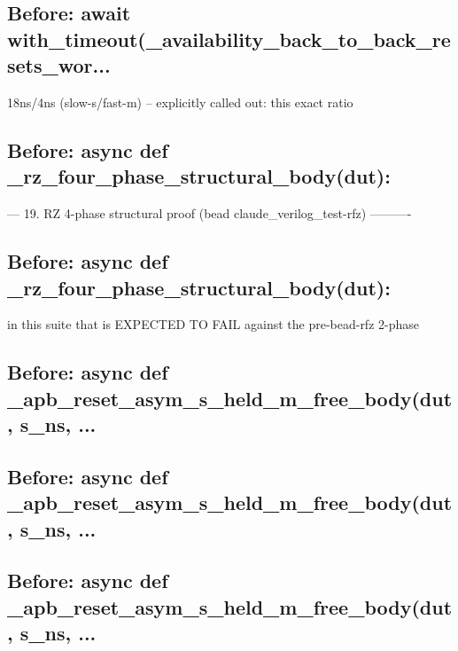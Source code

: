 \begin{record}
\subsection*{Before: await with\_timeout(\_availability\_back\_to\_back\_resets\_wor...}

\begin{textblock}
18ns/4ns (slow-s/fast-m) -- explicitly called out: this exact ratio
\end{textblock}

\subsection*{Before: async def \_rz\_four\_phase\_structural\_body(dut):}

\begin{textblock}
--- 19. RZ 4-phase structural proof (bead claude_verilog_test-rfz) ----------
\end{textblock}

\subsection*{Before: async def \_rz\_four\_phase\_structural\_body(dut):}

\begin{textblock}
in this suite that is EXPECTED TO FAIL against the pre-bead-rfz 2-phase
\end{textblock}

\subsection*{Before: async def \_apb\_reset\_asym\_s\_held\_m\_free\_body(dut, s\_ns, ...}


\subsection*{Before: async def \_apb\_reset\_asym\_s\_held\_m\_free\_body(dut, s\_ns, ...}


\subsection*{Before: async def \_apb\_reset\_asym\_s\_held\_m\_free\_body(dut, s\_ns, ...}


\end{record}
